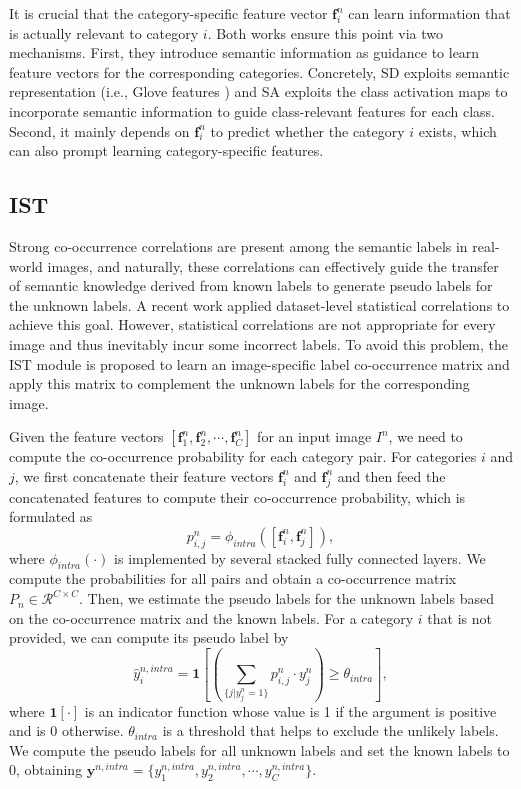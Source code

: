 It is crucial that the category-specific feature vector $\textbf{f}^n_i$ can learn information that is actually relevant to category $i$. Both works \cite{chen2019learning,Ye2020ADD-GCN} ensure this point via two mechanisms. First, they introduce semantic information as guidance to learn feature vectors for the corresponding categories. Concretely, SD \cite{chen2019learning} exploits semantic representation (i.e., Glove features \cite{pennington2014glove}) and SA \cite{Ye2020ADD-GCN} exploits the class activation maps to incorporate semantic information to guide class-relevant features for each class. Second, it mainly depends on $\textbf{f}^n_i$ to predict whether the category $i$ exists, which can also prompt learning category-specific features.


\subsection{IST}
Strong co-occurrence correlations are present among the semantic labels in real-world images, and naturally, these correlations can effectively guide the transfer of semantic knowledge derived from known labels to generate pseudo labels for the unknown labels. A recent work \cite{huynh2020interactive} applied dataset-level statistical correlations to achieve this goal. However, statistical correlations are not appropriate for every image and thus inevitably incur some incorrect labels. To avoid this problem, the IST module is proposed to learn an image-specific label co-occurrence matrix and apply this matrix to complement the unknown labels for the corresponding image.

Given the feature vectors $[\textbf{f}^n_1, \textbf{f}^n_2, \cdots, \textbf{f}^n_C]$ for an input image $I^n$, we need to compute the co-occurrence probability for each category pair. For categories $i$ and $j$, we first concatenate their feature vectors $\textbf{f}^n_i$ and $\textbf{f}^n_j$ and then feed the concatenated features to compute their co-occurrence probability, which is formulated as
\begin{equation}
 p_{i,j}^{n}=\phi_{intra}([\textbf{f}^n_i, \textbf{f}^n_j]),
\end{equation}
where $\phi_{intra}(\cdot)$ is implemented by several stacked fully connected layers. We compute the probabilities for all pairs and obtain a co-occurrence matrix $P_n\in \mathcal{R}^{C\times C}$. Then, we estimate the pseudo labels for the unknown labels based on the co-occurrence matrix and the known labels. For a category $i$ that is not provided, we can compute its pseudo label by
\begin{equation}
 \hat{y}^{n, intra}_{i}=\textbf{1}[(\sum_{\{j|y^{n}_{j}=1\}}p_{i,j}^{n} \cdot y^{n}_{j}) \ge \theta_{intra}],
 \label{equ:intra-label}
\end{equation}
where $\textbf{1}[\cdot]$ is an indicator function whose value is 1 if the argument is positive and is 0 otherwise. $\theta_{intra}$ is a threshold that helps to exclude the unlikely labels. We compute the pseudo labels for all unknown labels and set the known labels to 0, obtaining $\textbf{y}^{n, intra}=\{y^{n, intra}_1, y^{n, intra}_2, \cdots, y^{n, intra}_C\}$.

